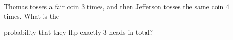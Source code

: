 Thomas tosses a fair coin $3$ times, and then Jefferson tosses the same coin $4$ times. What is the

probability that they flip exactly $3$ heads in total?
